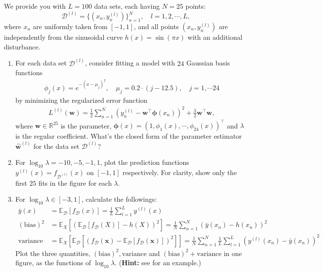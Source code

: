 \documentclass[11pt,letter,notitlepage]{article}
\begin{document}
\begin{exercise}\label{BiasVariance}
    We provide you with $L=100$ data sets, each having $N=25$ points:
    $$
    \mathcal{D}^{(l)}=\{ (x_n,y_n^{(l)})\}_{n=1}^N,\quad l=1,2,\cdots ,L,
    $$
    where $x_n$ are uniformly taken from $[-1,1]$, and all points $(x_n, y_n^{(l)})$ are independently from the sinusoidal curve $h(x)=\sin (\pi x)$ with an additional disturbance.
    \begin{enumerate}
        \item For each data set $\mathcal{D}^{(l)}$, consider fitting a model with $24$ Gaussian basis functions
        \begin{align*}
            \phi_j(x)= e^{-(x-\mu_j)^2},\quad \mu_j = 0.2 \cdot (j-12.5),\quad j = 1,\cdots 24
        \end{align*}
        by minimizing the regularized error function
        \begin{align*}
            L^{(l)}(\mathbf{w}) = \frac{1}{2}\sum_{n=1}^N (y^{(l)}_n - \mathbf{w}^\top \bm{\phi}(x_n))^2 + \frac{\lambda}{2}\mathbf{w}^\top\mathbf{w},
        \end{align*}
        where $\mathbf{w}\in\mathbb{R}^{25}$ is the parameter, $\bm{\phi}(x)=(1, \phi_1(x),\cdots,\phi_{24}(x))^\top$ and $\lambda$ is the regular coefficient. What's the closed form of the parameter estimator $\hat{\mathbf{w}}^{(l)}$ for the data set $\mathcal{D}^{(l)}$?

        \item For $\log_{10}\lambda = -10, -5,-1,1$, plot the prediction functions $y^{(l)}(x)=f_{\mathcal{D}^{(l)}}(x)$ on $[-1,1]$ respectively. For clarity, show only the first $25$ fits in the figure for each $\lambda$.

        \item For $\log_{10}\lambda\in [-3,1]$, calculate the followings:
        \begin{align*}
            \bar{y}(x)& =\mathbb{E}_{\mathcal{D}}[f_{\mathcal{D}}(x)]=\frac{1}{L}\sum_{l=1}^L y^{(l)}(x) \\
            (\mbox{bias})^2& =\mathbb{E}_X[(\mathbb{E}_{\mathcal{D}}[f_{\mathcal{D}}(X)]-h(X))^2]=\frac{1}{N}\sum_{n=1}^N (\bar{y}(x_n)-h(x_n))^2\\
            \mbox{variance} &= \mathbb{E}_X[\mathbb{E}_{\mathcal{D}}[(f_{\mathcal{D}}(\mathbf{x})-\mathbb{E}_{\mathcal{D}}[f_{\mathcal{D}}(\mathbf{x})])^2]] = \frac{1}{N}\sum_{n=1}^N\frac{1}{L}\sum_{l=1}^L (y^{(l)}(x_n)-\bar{y}(x_n))^2
        \end{align*}
        Plot the three quantities, $(\mbox{bias})^2, \mbox{variance}$ and $(\mbox{bias})^2 + \mbox{variance}$ in one figure, as the functions of $\log_{10}\lambda$.
        (\textbf{Hint:} see \cite{Bishop2006} for an example.)
    \end{enumerate}

\end{exercise}
\end{document}
